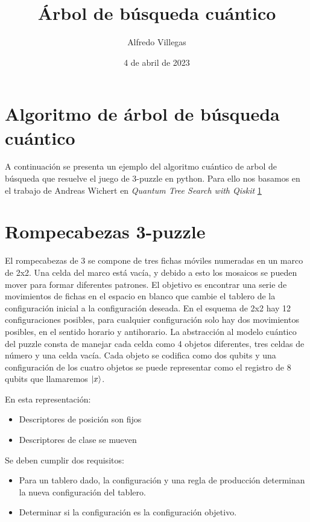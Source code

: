 \documentclass[11pt]{article}
\title{Árbol de búsqueda cuántico}
\author{Alfredo Villegas}
\date{4 de abril de 2023}
\providecommand{\tightlist}{%
      \setlength{\itemsep}{0pt}\setlength{\parskip}{0pt}}
\begin{document}
    
    \maketitle
    
    

    
    \hypertarget{algoritmo-de-uxe1rbol-de-buxfasqueda-cuuxe1ntico}{%
\section*{Algoritmo de árbol de búsqueda
cuántico}\label{algoritmo-de-uxe1rbol-de-buxfasqueda-cuuxe1ntico}}

A continuación se presenta un ejemplo del algoritmo cuántico de arbol de
búsqueda que resuelve el juego de 3-puzzle en python. Para ello nos
basamos en el trabajo de Andreas Wichert en \emph{Quantum Tree Search
with Qiskit} \href{https://doi.org/10.3390/math10173103}{1}

    \hypertarget{rompecabezas-3-puzzle}{%
\section{Rompecabezas 3-puzzle}\label{rompecabezas-3-puzzle}}

El rompecabezas de 3 se compone de tres fichas móviles numeradas en un
marco de 2x2. Una celda del marco está vacía, y debido a esto los
mosaicos se pueden mover para formar diferentes patrones. El objetivo es
encontrar una serie de movimientos de fichas en el espacio en blanco que
cambie el tablero de la configuración inicial a la configuración
deseada. En el esquema de 2x2 hay 12 configuraciones posibles, para
cualquier configuración solo hay dos movimientos posibles, en el sentido
horario y antihorario. La abstracción al modelo cuántico del puzzle
consta de manejar cada celda como 4 objetos diferentes, tres celdas de
número y una celda vacía. Cada objeto se codifica como dos qubits y una
configuración de los cuatro objetos se puede representar como el
registro de 8 qubits que llamaremos \(\ket{x}\).

En esta representación:

\begin{itemize}
\tightlist
\item
  Descriptores de posición son fijos
\item
  Descriptores de clase se mueven
\end{itemize}

Se deben cumplir dos requisitos:

\begin{itemize}
\tightlist
\item
  Para un tablero dado, la configuración y una regla de producción
  determinan la nueva configuración del tablero.
\item
  Determinar si la configuración es la configuración objetivo.
\end{itemize}
\end{document}
